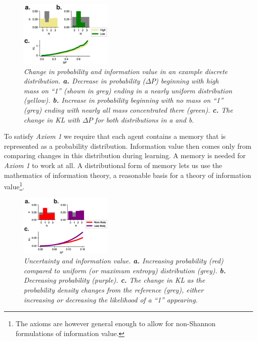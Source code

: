 \documentclass[9pt,twocolumn,twoside]{pnas-new}
\begin{document}
\begin{figure}
\includegraphics[width=0.4\textwidth]{figures/metrics_updown.eps}
\caption{
\textit{Change in probability and information value in an example discrete distribution. 
\textbf{a.} Decrease in probability ($\Delta P$) beginning with high mass on ``1'' (shown in grey) ending in a nearly uniform distribution (yellow). 
\textbf{b.} Increase in probability beginning with no mass on ``1'' (grey) ending with nearly all mass concentrated there (green). 
\textbf{c.} The change in KL with $\Delta P$ for both distributions in \textit{a} and \textit{b}.}
}
\label{fig:metrics_updown}
\end{figure}

To satisfy \textit{Axiom 1} we require that each agent contains a memory that is represented as a probability distribution. Information value then comes only from comparing changes in this distribution during learning. A memory is needed for \textit{Axiom 1} to work at all. A distributional form of memory lets us use the mathematics of information theory, a reasonable basis for a theory of information value\footnote{The axioms are however general enough to allow for non-Shannon formulations of information value.}. 

\begin{figure}
\includegraphics[width=0.4\textwidth]{figures/metrics_likelihood.eps}
\caption{
\textit{Uncertainty and information value.
\textbf{a.} Increasing probability (red) compared to uniform (or maximum entropy) distribution (grey).
\textbf{b.} Decreasing probability (purple).
\textbf{c.} The change in KL as the probability density changes from the reference (grey), either increasing or decreasing the likelihood of a ``1'' appearing.}}
\label{fig:metrics_likelihood}
\end{figure}
\end{document}
